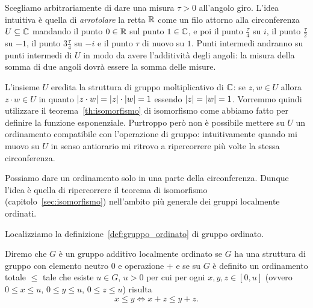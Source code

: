 Scegliamo arbitrariamente di dare una misura $\tau>0$ all'angolo giro.
L'idea intuitiva è quella di \emph{arrotolare} la retta ${\mathbb R}$ come un filo 
attorno alla circonferenza $U\subseteq {\mathbb C}$ 
mandando il punto $0\in {\mathbb R}$ sul punto $1\in {\mathbb C}$,
e poi il punto $\frac \tau 4$ su $i$, il punto $\frac \tau 2$ su $-1$,
il punto $3\frac \tau 4$ su $-i$ e il punto $\tau$ di nuovo su $1$.
Punti intermedi andranno su punti intermedi di $U$ in modo da avere 
l'additività degli angoli: la misura della somma di due angoli dovrà 
essere la somma delle misure.

L'insieme $U$ eredita la struttura di gruppo moltiplicativo di ${\mathbb C}$: 
se $z,w\in U$ 
allora $z\cdot w \in U$ in quanto ${\left|z\cdot w\right|} = {\left|z\right|}\cdot {\left|w\right|} = 1$
essendo ${\left|z\right|}={\left|w\right|}=1$. 
Vorremmo quindi utilizzare il teorema~\ref{th:isomorfismo} di isomorfismo 
come abbiamo fatto per definire la funzione esponenziale.
Purtroppo però non è possibile mettere su $U$ 
un ordinamento compatibile con l'operazione di gruppo: intuitivamente 
quando mi muovo su $U$ in senso antiorario mi ritrovo a ripercorrere più volte 
la stessa circonferenza.

Possiamo dare un ordinamento solo in una parte della circonferenza. 
Dunque l'idea è quella di ripercorrere il teorema di isomorfismo (capitolo~\ref{sec:isomorfismo}) 
nell'ambito più generale dei gruppi localmente ordinati.

Localizziamo la definizione~\ref{def:gruppo_ordinato} di gruppo ordinato.
%
\begin{definition}
Diremo che $G$ è un gruppo additivo localmente ordinato 
se $G$ ha una struttura di gruppo con elemento neutro $0$ e operazione $+$ 
e se su $G$ è definito un ordinamento totale $\le$ tale che 
esiste $u\in G$, $u>0$ per cui per ogni $x,y,z \in [0,u]$
(ovvero $0\le x\le u$, $0\le y\le u$, $0\le z \le u$)
risulta 
\[
    x \le y \iff x+z \le y+z.
\]
\end{definition}

